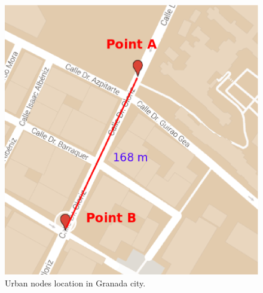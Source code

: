 \documentclass[preprint]{elsarticle}
\begin{document}
\begin{figure}[htb]
	\begin{center}
		\includegraphics[scale=0.4]{imgs/mososMapa.eps}
		\caption{Urban nodes location in Granada city.}
	\label{fig:mososMapa}
	\end{center}
\end{figure}
\end{document}
